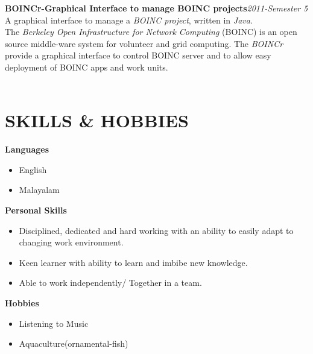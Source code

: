 \documentclass[line,margin]{res}
\begin{document}
\begin{resume}
                  {\bf BOINCr-Graphical Interface to manage BOINC projects}\hfill {\it 2011-Semester 5}\\
	                          
	     	  A graphical interface to manage a {\it BOINC project}, written in {\it Java}.\\
	     	  The {\it Berkeley Open Infrastructure for Network Computing }(BOINC) is an open source middle-ware system for volunteer and grid computing. The {\it BOINCr} provide a graphical interface to control BOINC server and to allow easy deployment of BOINC apps and work units.\\\\	
	                          
	  \section{SKILLS \& HOBBIES}
	          {\bf Languages}
	          \begin{itemize} \itemsep -2pt
	          \item English
	          \item Malayalam
	          \end{itemize}
	          {\bf Personal Skills}
	          \begin{itemize} \itemsep -2pt
	          \item Disciplined, dedicated and hard working with an ability to easily adapt to changing work environment.
	          \item Keen learner with ability to learn and imbibe new knowledge.
	          \item Able to work independently/ Together in a team.
	          \end{itemize}
	          {\bf Hobbies}
	          \begin{itemize} \itemsep -2pt
	          \item Listening to Music
	          \item Aquaculture(ornamental-fish)
	          \end{itemize}
	          \vspace{10 mm}                                 

\end{resume}
\end{document}
